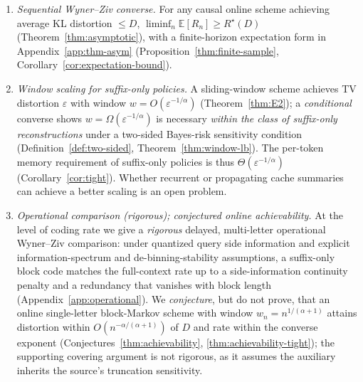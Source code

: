 \documentclass[11pt]{article}
\newcommand{\E}{\mathbb{E}}
\theoremstyle{plain}
\theoremstyle{definition}
\theoremstyle{remark}
\begin{document}
\begin{enumerate}[label=\textbf{(C\arabic*)},leftmargin=*,itemsep=2pt,topsep=2pt]
\item \emph{Sequential Wyner--Ziv converse.} For any causal online
scheme achieving average KL distortion $\leq D$,
$\liminf_n \E[R_n] \geq R^\star(D)$
(Theorem~\ref{thm:asymptotic}), with a finite-horizon expectation form in
Appendix~\ref{app:thm-asym} (Proposition~\ref{thm:finite-sample},
Corollary~\ref{cor:expectation-bound}).

\item \emph{Window scaling for suffix-only policies.} A
sliding-window scheme achieves TV distortion $\varepsilon$ with
window $w = O(\varepsilon^{-1/\alpha})$ (Theorem~\ref{thm:E2}); a
\emph{conditional} converse shows $w = \Omega(\varepsilon^{-1/\alpha})$
is necessary \emph{within the class of suffix-only reconstructions}
under a two-sided Bayes-risk sensitivity condition
(Definition~\ref{def:two-sided}, Theorem~\ref{thm:window-lb}). The
per-token memory requirement of suffix-only policies is thus
$\Theta(\varepsilon^{-1/\alpha})$ (Corollary~\ref{cor:tight}).
Whether recurrent or propagating cache summaries can achieve a better
scaling is an open problem.

\item \emph{Operational comparison (rigorous); conjectured online
achievability.} At the level of coding rate we give a \emph{rigorous}
delayed, multi-letter operational Wyner--Ziv comparison: under
quantized query side information and explicit information-spectrum and
de-binning-stability assumptions, a suffix-only block code matches the
full-context rate up to a side-information continuity penalty and a redundancy that
vanishes with block length (Appendix~\ref{app:operational}). We
\emph{conjecture}, but do not prove, that an online single-letter
block-Markov scheme with window $w_n = n^{1/(\alpha+1)}$ attains
distortion within $O(n^{-\alpha/(\alpha+1)})$ of $D$ and rate within
the converse exponent (Conjectures~\ref{thm:achievability},
\ref{thm:achievability-tight}); the supporting covering argument is
not rigorous, as it assumes the auxiliary inherits the source's
truncation sensitivity.


\end{enumerate}
\end{document}
